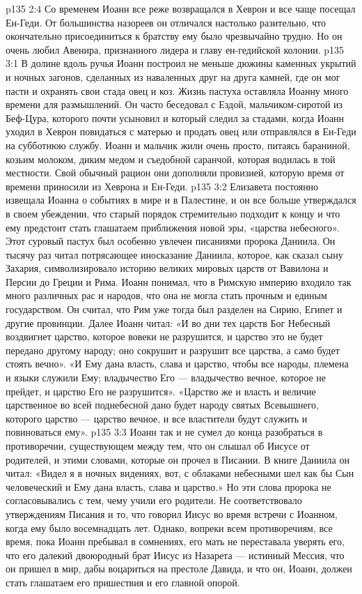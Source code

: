\vs p135 2:4 Со временем Иоанн все реже возвращался в Хеврон и все чаще посещал Ен\hyp{}Геди. От большинства назореев он отличался настолько разительно, что окончательно присоединиться к братству ему было чрезвычайно трудно. Но он очень любил Авенира, признанного лидера и главу ен\hyp{}гедийской колонии.
\vs p135 3:1 В долине вдоль ручья Иоанн построил не меньше дюжины каменных укрытий и ночных загонов, сделанных из наваленных друг на друга камней, где он мог пасти и охранять свои стада овец и коз. Жизнь пастуха оставляла Иоанну много времени для размышлений. Он часто беседовал с Ездой, мальчиком\hyp{}сиротой из Беф\hyp{}Цура, которого почти усыновил и который следил за стадами, когда Иоанн уходил в Хеврон повидаться с матерью и продать овец или отправлялся в Ен\hyp{}Геди на субботнюю службу. Иоанн и мальчик жили очень просто, питаясь бараниной, козьим молоком, диким медом и съедобной саранчой, которая водилась в той местности. Свой обычный рацион они дополняли провизией, которую время от времени приносили из Хеврона и Ен\hyp{}Геди.
\vs p135 3:2 \pc Елизавета постоянно извещала Иоанна о событиях в мире и в Палестине, и он все больше утверждался в своем убеждении, что старый порядок стремительно подходит к концу и что ему предстоит стать глашатаем приближения новой эры, «царства небесного». Этот суровый пастух был особенно увлечен писаниями пророка Даниила. Он тысячу раз читал потрясающее иносказание Даниила, которое, как сказал сыну Захария, символизировало историю великих мировых царств от Вавилона и Персии до Греции и Рима. Иоанн понимал, что в Римскую империю входило так много различных рас и народов, что она не могла стать прочным и единым государством. Он считал, что Рим уже тогда был разделен на Сирию, Египет и другие провинции. Далее Иоанн читал: «И во дни тех царств Бог Небесный воздвигнет царство, которое вовеки не разрушится, и царство это не будет передано другому народу; оно сокрушит и разрушит все царства, а само будет стоять вечно». «И Ему дана власть, слава и царство, чтобы все народы, племена и языки служили Ему; владычество Его --- владычество вечное, которое не прейдет, и царство Его не разрушится». «Царство же и власть и величие царственное во всей поднебесной дано будет народу святых Всевышнего, которого царство --- царство вечное, и все властители будут служить и повиноваться ему».
\vs p135 3:3 \pc Иоанн так и не сумел до конца разобраться в противоречии, существующем между тем, что он слышал об Иисусе от родителей, и этими словами, которые он прочел в Писании. В книге Даниила он читал: «Видел я в ночных видениях, вот, с облаками небесными шел как бы Сын человеческий и Ему дана власть, слава и царство.» Но эти слова пророка не согласовывались с тем, чему учили его родители. Не соответствовало утверждениям Писания и то, что говорил Иисус во время встречи с Иоанном, когда ему было восемнадцать лет. Однако, вопреки всем противоречиям, все время, пока Иоанн пребывал в сомнениях, его мать не переставала уверять его, что его далекий двоюродный брат Иисус из Назарета --- истинный Мессия, что он пришел в мир, дабы воцариться на престоле Давида, и что он, Иоанн, должен стать глашатаем его пришествия и его главной опорой.
